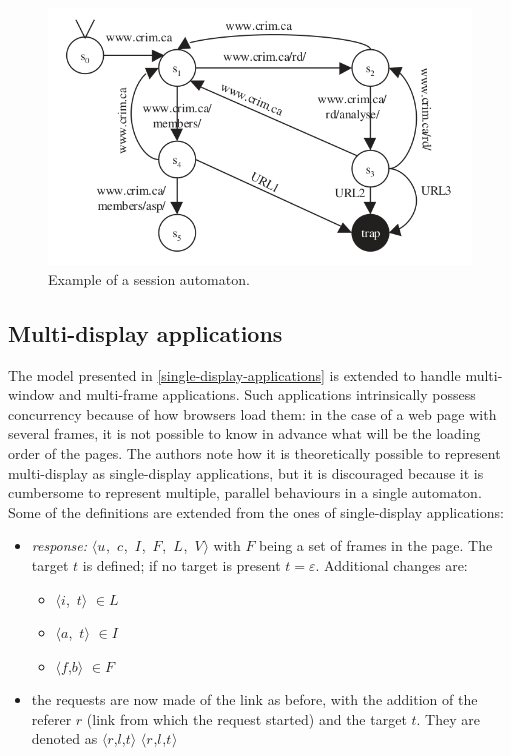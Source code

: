 \documentclass[a4paper,10pt]{article}
\newcommand{\tuple}[1]{\mbox{$\langle$#1$\rangle$}}
\newcommand{\reqmulti}[1][]{
  \ifthenelse{\equal{#1}{}} {\mbox{$\langle r$,$l$,$t\rangle$}}
  {\mbox{$\langle r_{#1}$,$l_{#1}$,$t_{#1}\rangle$}}
}
\newcommand{\resmulti}[1][]{
  \ifthenelse{\equal{#1}{}}{\mbox{$\langle u$, $c$, $I$, $F$, $L$, $V\rangle$}}
  {\mbox{$\langle u_{#1}$, $c_{#1}$, $I_{#1}$, $F_{#1}$, $L_{#1}$, $V_{#1}\rangle$}}
}
\theoremstyle{plain} %
\theoremstyle{definition}
\theoremstyle{remark}
\begin{document}
\begin{figure}[h]
  \includegraphics[width=\textwidth]{img/session_automaton_example.png}
  \caption{Example of a session automaton.}
  \label{fig:example-session-automaton}
\end{figure}

\subsection{Multi-display applications}

The model presented in \cref{single-display-applications} is extended to handle multi-window and multi-frame applications. Such applications intrinsically possess concurrency because of how browsers load them: in the case of a web page with several frames, it is not possible to know in advance what will be the loading order of the pages. The authors note how it is theoretically possible to represent multi-display as single-display applications, but it is discouraged because it is cumbersome to represent multiple, parallel behaviours in a single automaton. Some of the definitions are extended from the ones of single-display applications:

\begin{itemize}
  \item \textit{response:} \resmulti with $F$ being a set of frames in the page. The target $t$ is defined; if no target is present $t = \varepsilon$. Additional changes are:
    \begin{itemize}
      \item \tuple{$i$, $t$} $\in L$
      \item \tuple{$a$, $t$} $\in I$
      \item \tuple{$f$,$b$} $\in F$
    \end{itemize}
  \item the requests are now made of the link as before, with the addition of the referer $r$ (link from which the request started) and the target $t$. They are denoted as \reqmulti
\end{itemize}
\end{document}
